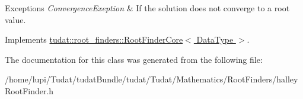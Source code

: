 \begin{DoxyExceptions}{Exceptions}
{\em Convergence\+Exeption} & If the solution does not converge to a root value. \\
\hline
\end{DoxyExceptions}


Implements \hyperlink{classtudat_1_1root__finders_1_1RootFinderCore_a1fcd710906f66ebea649c83f08c2ae97}{tudat\+::root\+\_\+finders\+::\+Root\+Finder\+Core$<$ Data\+Type $>$}.



The documentation for this class was generated from the following file\+:\begin{DoxyCompactItemize}
\item 
/home/lupi/\+Tudat/tudat\+Bundle/tudat/\+Tudat/\+Mathematics/\+Root\+Finders/halley\+Root\+Finder.\+h\end{DoxyCompactItemize}
